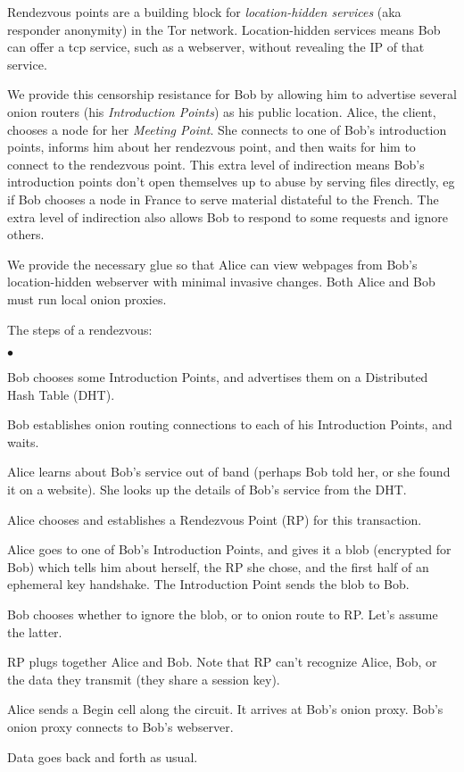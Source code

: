 \documentclass[times,10pt,twocolumn]{article}
\newenvironment{tightlist}{\begin{list}{$\bullet$}{
  \setlength{\itemsep}{0mm}
    \setlength{\parsep}{0mm}
    }}{\end{list}}
\begin{document}
\label{sec:rendezvous}

Rendezvous points are a building block for \emph{location-hidden services}
(aka responder anonymity) in the Tor network. Location-hidden
services means Bob can offer a tcp service, such as a webserver,
without revealing the IP of that service.

We provide this censorship resistance for Bob by allowing him to
advertise several onion routers (his \emph{Introduction Points}) as his
public location. Alice, the client, chooses a node for her \emph{Meeting
Point}. She connects to one of Bob's introduction points, informs him
about her rendezvous point, and then waits for him to connect to the
rendezvous
point. This extra level of indirection means Bob's introduction points
don't open themselves up to abuse by serving files directly, eg if Bob
chooses a node in France to serve material distateful to the French. The
extra level of indirection also allows Bob to respond to some requests
and ignore others.

We provide the necessary glue so that Alice can view webpages from Bob's
location-hidden webserver with minimal invasive changes. Both Alice and
Bob must run local onion proxies.

The steps of a rendezvous:
\begin{tightlist}
\item Bob chooses some Introduction Points, and advertises them on a
      Distributed Hash Table (DHT).
\item Bob establishes onion routing connections to each of his
      Introduction Points, and waits.
\item Alice learns about Bob's service out of band (perhaps Bob told her,
      or she found it on a website). She looks up the details of Bob's
      service from the DHT.
\item Alice chooses and establishes a Rendezvous Point (RP) for this
      transaction.
\item Alice goes to one of Bob's Introduction Points, and gives it a blob
      (encrypted for Bob) which tells him about herself, the RP
      she chose, and the first half of an ephemeral key handshake. The
      Introduction Point sends the blob to Bob.
\item Bob chooses whether to ignore the blob, or to onion route to RP.
      Let's assume the latter.
\item RP plugs together Alice and Bob. Note that RP can't recognize Alice,
      Bob, or the data they transmit (they share a session key).
\item Alice sends a Begin cell along the circuit. It arrives at Bob's
      onion proxy. Bob's onion proxy connects to Bob's webserver.
\item Data goes back and forth as usual.
\end{tightlist}
\end{document}
